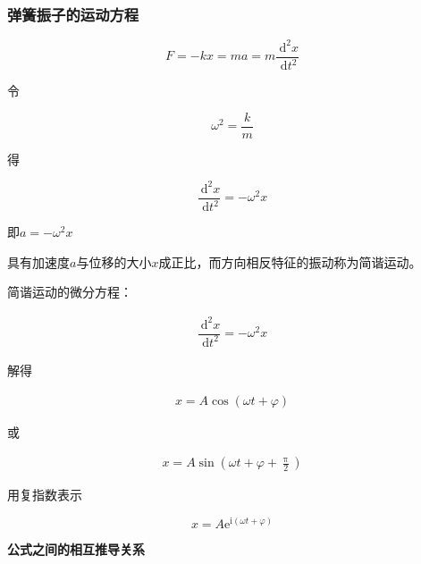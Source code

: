 \documentclass[12pt, a4paper]{article}
\numberwithin{equation}{section}
\newcommand{\rmd}{\mathrm{~d}}
\begin{document}
\subsubsection{弹簧振子的运动方程}

    \begin{equation}
        F=-k x=m a=m \frac{\rmd^2 x}{\rmd t^2}
    \end{equation}

    令
    
    \[
        \omega^2=\frac{k}{m}
    \]
    
    得
    
    \[
        \dfrac{\rmd^2 x}{\rmd t^2} = -\omega^2 x
    \]

    即\(a=-\omega^2 x\)

    具有加速度\(a\)与位移的大小\(x\)成正比，而方向相反特征的振动称为简谐运动。

    简谐运动的微分方程：

    \begin{align}
        \dfrac{\rmd^2 x}{\rmd t^2} = -\omega^2 x
        \label{6-1-2}
    \end{align}

    解得

    \begin{align}
        x = A \cos\left(\omega t + \varphi\right)
    \end{align}

    或

    \begin{align}
        x = A \sin\left(\omega t + \varphi + \frac{\uppi}{2}\right)
    \end{align}

    用复指数表示
    
    \begin{equation}
        x=A \mathrm{e}^{\mathrm{i}(\omega t+\varphi)}
    \end{equation}

    \textbf{公式之间的相互推导关系}
\end{document}
